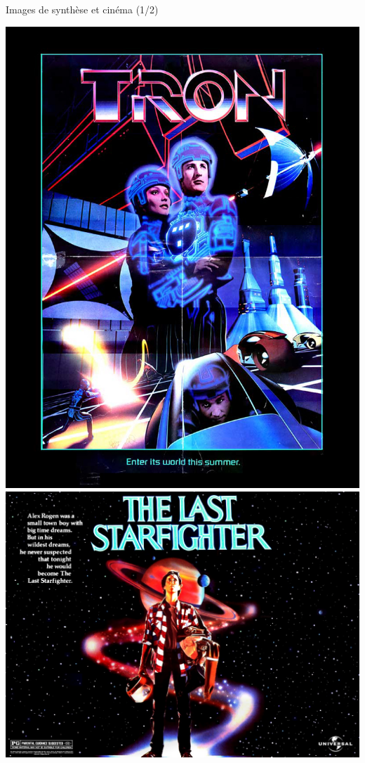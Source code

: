 \begin{frame}{Images de synthèse et cinéma (1/2)}
\begin{center}
\includegraphics[height=0.28\textheight]{figs/Tron1982.jpg}
\hspace{0.1cm}
\includegraphics[height=0.28\textheight]{figs/thelaststarfighter.jpg}

\end{center}
\end{frame}
